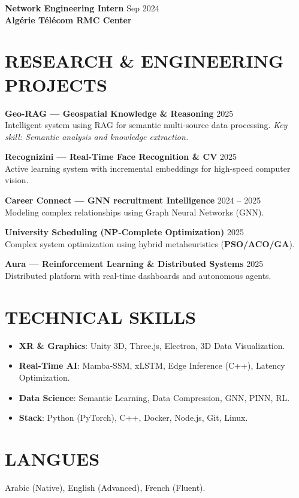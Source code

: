 \documentclass[a4paper,11pt]{article}
\begin{document}
\textbf{Network Engineering Intern} \hfill Sep 2024 \\
\textbf{Algérie Télécom RMC Center}

\section{RESEARCH & ENGINEERING PROJECTS}

\textbf{Geo-RAG — Geospatial Knowledge \& Reasoning} \hfill 2025 \\
Intelligent system using RAG for semantic multi-source data processing.
\textit{Key skill: Semantic analysis and knowledge extraction.}

\textbf{Recognizini — Real-Time Face Recognition \& CV} \hfill 2025 \\
Active learning system with incremental embeddings for high-speed computer vision.

\textbf{Career Connect — GNN recruitment Intelligence} \hfill 2024 -- 2025 \\
Modeling complex relationships using Graph Neural Networks (GNN).

\textbf{University Scheduling (NP-Complete Optimization)} \hfill 2025 \\
Complex system optimization using hybrid metaheuristics (\textbf{PSO/ACO/GA}).

\textbf{Aura — Reinforcement Learning \& Distributed Systems} \hfill 2025 \\
Distributed platform with real-time dashboards and autonomous agents.

\section{TECHNICAL SKILLS}
\begin{itemize}
    \item \textbf{XR \& Graphics}: Unity 3D, Three.js, Electron, 3D Data Visualization.
    \item \textbf{Real-Time AI}: Mamba-SSM, xLSTM, Edge Inference (C++), Latency Optimization.
    \item \textbf{Data Science}: Semantic Learning, Data Compression, GNN, PINN, RL.
    \item \textbf{Stack}: Python (PyTorch), C++, Docker, Node.js, Git, Linux.
\end{itemize}

\section{LANGUES}
Arabic (Native), English (Advanced), French (Fluent).
\end{document}
